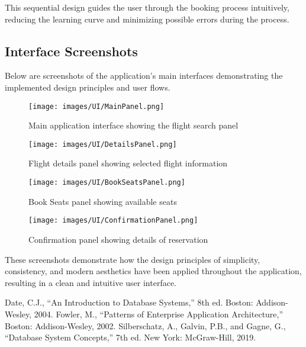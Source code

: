 \documentclass[conference]{IEEEtran}
\begin{document}
    This sequential design guides the user through the booking process intuitively, reducing the learning curve and minimizing possible errors during the process.

    \subsection{Interface Screenshots}
    Below are screenshots of the application's main interfaces demonstrating the implemented design principles and user flows.

    \begin{figure}[H]
        \centering
        \texttt{[image: images/UI/MainPanel.png]}
        \caption{Main application interface showing the flight search panel}
        \label{fig:main_interface}
    \end{figure}

    \begin{figure}[H]
        \centering
        \texttt{[image: images/UI/DetailsPanel.png]}
        \caption{Flight details panel showing selected flight information}
        \label{fig:flight_details}
    \end{figure}

    \begin{figure}[H]
        \centering
        \texttt{[image: images/UI/BookSeatsPanel.png]}
        \caption{Book Seats panel showing available seats}
        \label{fig:book_seats}
    \end{figure}
    \begin{figure}[H]
        \centering
        \texttt{[image: images/UI/ConfirmationPanel.png]}
        \caption{Confirmation panel showing details of reservation}
        \label{fig:confirm_interface}
    \end{figure}


    These screenshots demonstrate how the design principles of simplicity, consistency, and modern aesthetics have been applied throughout the application, resulting in a clean and intuitive user interface.



    \begin{thebibliography}{00}
         Date, C.J., ``An Introduction to Database Systems,'' 8th ed. Boston: Addison-Wesley, 2004.
         Fowler, M., ``Patterns of Enterprise Application Architecture,'' Boston: Addison-Wesley, 2002.
         Silberschatz, A., Galvin, P.B., and Gagne, G., ``Database System Concepts,'' 7th ed. New York: McGraw-Hill, 2019.
    \end{thebibliography}
\end{document}
